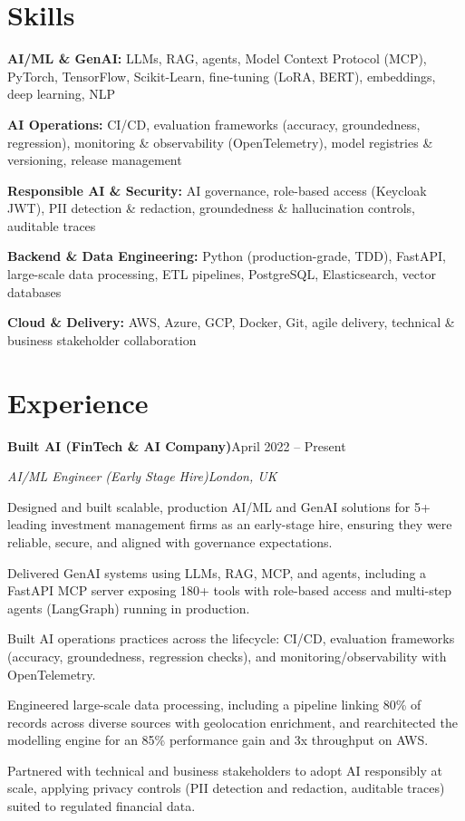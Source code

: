 \documentclass[10pt,a4paper]{article}
\newcommand{\entry}[4]{%
  {\color{company}\bfseries #1}\hfill {\color{muted}#2}\par
  \vspace{1pt}
  {\itshape #3}\hfill {\color{muted}\itshape #4}\par
  \vspace{3pt}%
}
\begin{document}
\section{Skills}
\begin{tight}
  \item[\textcolor{accent}{\small$\bullet$}] \textbf{AI/ML \& GenAI:} LLMs, RAG, agents, Model Context Protocol (MCP), PyTorch, TensorFlow, Scikit-Learn, fine-tuning (LoRA, BERT), embeddings, deep learning, NLP
  \item[\textcolor{accent}{\small$\bullet$}] \textbf{AI Operations:} CI/CD, evaluation frameworks (accuracy, groundedness, regression), monitoring \& observability (OpenTelemetry), model registries \& versioning, release management
  \item[\textcolor{accent}{\small$\bullet$}] \textbf{Responsible AI \& Security:} AI governance, role-based access (Keycloak JWT), PII detection \& redaction, groundedness \& hallucination controls, auditable traces
  \item[\textcolor{accent}{\small$\bullet$}] \textbf{Backend \& Data Engineering:} Python (production-grade, TDD), FastAPI, large-scale data processing, ETL pipelines, PostgreSQL, Elasticsearch, vector databases
  \item[\textcolor{accent}{\small$\bullet$}] \textbf{Cloud \& Delivery:} AWS, Azure, GCP, Docker, Git, agile delivery, technical \& business stakeholder collaboration
\end{tight}

\section{Experience}
\entry{Built AI (FinTech \& AI Company)}{April 2022 -- Present}{AI/ML Engineer (Early Stage Hire)}{London, UK}
\begin{tight}
  \item Designed and built scalable, production AI/ML and GenAI solutions for 5+ leading investment management firms as an early-stage hire, ensuring they were reliable, secure, and aligned with governance expectations.
  \item Delivered GenAI systems using LLMs, RAG, MCP, and agents, including a FastAPI MCP server exposing 180+ tools with role-based access and multi-step agents (LangGraph) running in production.
  \item Built AI operations practices across the lifecycle: CI/CD, evaluation frameworks (accuracy, groundedness, regression checks), and monitoring/observability with OpenTelemetry.
  \item Engineered large-scale data processing, including a pipeline linking 80\% of records across diverse sources with geolocation enrichment, and rearchitected the modelling engine for an 85\% performance gain and 3x throughput on AWS.
  \item Partnered with technical and business stakeholders to adopt AI responsibly at scale, applying privacy controls (PII detection and redaction, auditable traces) suited to regulated financial data.
\end{tight}
\end{document}
